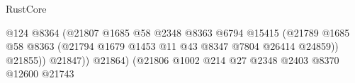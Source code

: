 \begin{lexlean}{RustCore}
\begin{coremodule}
                                                                      @124
                                                                      @8364
                                                                      (@21807
                                                                        @1685
                                                                        @58
                                                                        @2348
                                                                        @8363
                                                                        @6794
                                                                        @15415
                                                                        (@21789
                                                                          @1685
                                                                          @58
                                                                          @8363
                                                                          (@21794
                                                                            @1679
                                                                            @1453
                                                                            @11
                                                                            @43
                                                                            @8347
                                                                            @7804
                                                                            @26414
                                                                            @24859))
                                                                        @21855))
                                                                    @21847))
                                                                @21864)
                                                              (@21806
                                                                @1002
                                                                @214
                                                                @27
                                                                @2348
                                                                @2403
                                                                @8370
                                                                @12600
                                                                @21743

\end{coremodule}
\end{lexlean}
